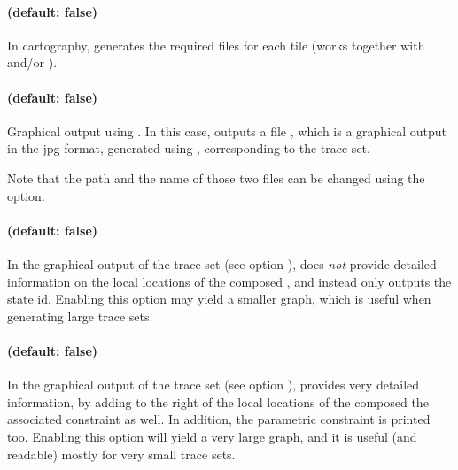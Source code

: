 \paragraph{ (default: false)}
In cartography, generates the required files for each tile (works together with  and/or ).


\paragraph{ (default: false)}
Graphical output using \gdot{}.
In this case, \imitator{} outputs a file , which is a graphical output in the jpg format, generated using \gdot{}, corresponding to the trace set.

Note that the path and the name of those two files can be changed using the  option.


\paragraph{ (default: false)}

In the graphical output of the trace set (see option ),
does \emph{not} provide detailed information on the local locations of the composed \IPTA{}, and instead only outputs the state id.
Enabling this option may yield a smaller graph, which is useful when generating large trace sets.


\paragraph{ (default: false)}

In the graphical output of the trace set (see option ),
provides very detailed information, by adding to the right of the local locations of the composed \IPTA{} the associated constraint as well.
In addition, the parametric constraint is printed too.
Enabling this option will yield a very large graph, and it is useful (and readable) mostly for very small trace sets.


